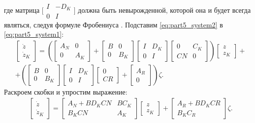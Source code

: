 где матрица $\bigl[ \begin{smallmatrix}  {I} & -{D}_K \\ 0 & {I} \end{smallmatrix} \bigr]$ должна быть невырожденной, которой она и будет всегда являться, следуя формуле Фробениуса \cite{froben}.
Подставим \eqref{eq:part5_system2} в \eqref{eq:part5_system1}:
\begin{align}
	\nonumber
	& \begin{bmatrix}
		{\dot{z}} \\ {\dot{z}}_K 
	\end{bmatrix}
	=\left(
	\begin{bmatrix}
		{A}_N & 0 \\
		0 & {A}_K
	\end{bmatrix}
	+
	\begin{bmatrix}
		{B} & 0 \\
		0 & {B}_K
	\end{bmatrix}
	\begin{bmatrix}
		{I} & {D}_K \\
		0 & {I}
	\end{bmatrix}
	\begin{bmatrix}
		0 & {C}_K \\
		{C}{N} & 0
	\end{bmatrix}
	\right)
	\begin{bmatrix}
		{z} \\ {z}_K
	\end{bmatrix}
	+ \\
	& + \left(
	\begin{bmatrix}
		{B} & 0 \\
		0 & {B}_K
	\end{bmatrix}
	\begin{bmatrix}
		{I} & {D}_K \\
		0 & {I}
	\end{bmatrix}
	\begin{bmatrix}
		0 \\ {C}{R}
	\end{bmatrix}
	+
	\begin{bmatrix}
		{A}_R \\ 0 
	\end{bmatrix}\right)
	{\zeta}.
\end{align}
Раскроем скобки и упростим выражение:
\begin{align}
	\label{eq:part5_cl}
	&\begin{bmatrix}
		{\dot{z}} \\ {\dot{z}}_K 
	\end{bmatrix}
	=
	\begin{bmatrix}
		{A}_N + {B}{D}_K{C}{N} & {B}{C}_K \\
		{B}_K{C}{N} &{A}_K
	\end{bmatrix}
	\begin{bmatrix}
		{z} \\ {z}_K 
	\end{bmatrix}
	+
	\begin{bmatrix}
		{A}_R + {B}{D}_K{C}{R}\\ {B}_K{C}_R
	\end{bmatrix}
	{\zeta}.
\end{align}
